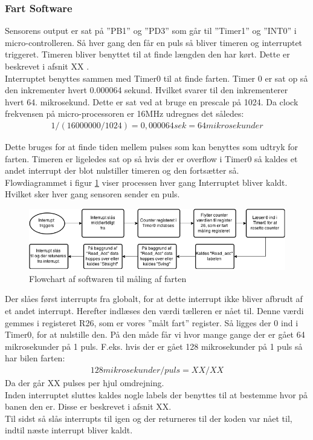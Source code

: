 \subsubsection{Fart Software}
\label{fartmål_software}
Sensorens output er sat på ”PB1” og ”PD3” som går til ”Timer1” og ”INT0” i micro-controlleren. Så hver gang den får en puls så bliver timeren og interruptet triggeret. Timeren bliver benyttet til at finde længden den har kørt. Dette er beskrevet i afsnit XX . \\

Interruptet benyttes sammen med Timer0 til at finde farten. Timer 0 er sat op så den inkrementer hvert 0.000064 sekund. Hvilket svarer til den inkrementerer hvert 64. mikrosekund. Dette er sat ved at bruge en prescale på 1024. Da clock frekvensen på micro-processoren er 16MHz udregnes det således: \\
\begin{align*}
1/(16 000 000 / 1024) = 0,000064 sek = 64 mikrosekunder 
\end{align*}

Dette bruges for at finde tiden mellem pulses som kan benyttes som udtryk for farten. Timeren er ligeledes sat op så hvis der er overflow i Timer0 så kaldes et andet interrupt der blot nulstiller timeren og den fortsætter så. \\

Flowdiagrammet i figur \ref{fart_chart} viser processen hver gang Interruptet bliver kaldt. Hvilket sker hver gang sensoren sender en puls. \\

\begin{figure}[h!]
\center
\includegraphics[scale=0.65]{./Graphics/fart_chart}
\caption{Flowchart af softwaren til måling af farten}
\label{fart_chart}
\end{figure}

Der slåes først interrupts fra globalt, for at dette interrupt ikke bliver afbrudt af et andet interrupt. Herefter indlæses den værdi tælleren er nået til. Denne værdi gemmes i registeret R26, som er vores ”målt fart” register. Så ligges der 0 ind i Timer0, for at nulstille den. På den måde får vi hvor mange gange der er gået 64 mikrosekunder på 1 puls. F.eks. hvis der er gået 128 mikrosekunder på 1 puls så har bilen farten: 
\begin{align*}
128 mikrosekunder / puls = XX / XX 
\end{align*}
Da der går XX pulses per hjul omdrejning. \\

Inden interruptet sluttes kaldes nogle labels der benyttes til at bestemme hvor på banen den er. Disse er beskrevet i afsnit XX.  \\

Til sidst så slås interrupts til igen og der returneres til der koden var nået til, indtil næste interrupt bliver kaldt.  

